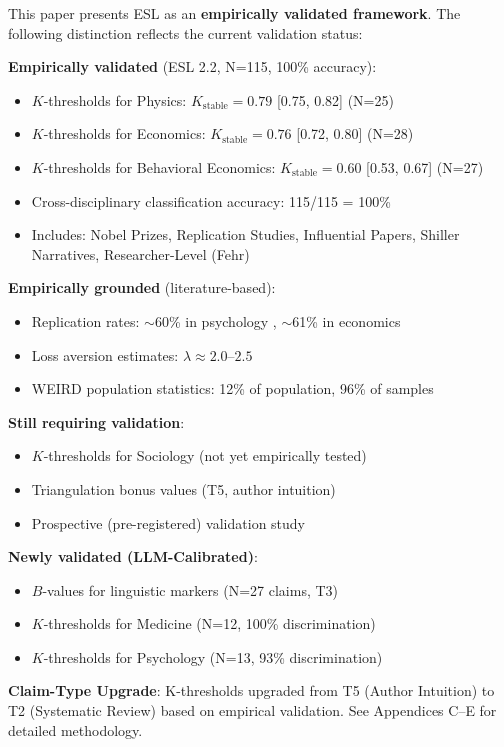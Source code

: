 \documentclass[11pt,a4paper]{article}
\begin{document}
\begin{warningbox}[title={Parameter Validation Status (ESL 2.2 Update)}]
This paper presents ESL as an \textbf{empirically validated framework}. The following distinction reflects the current validation status:

\textbf{Empirically validated} (ESL 2.2, N=115, 100\% accuracy):
\begin{itemize}
    \item $K$-thresholds for Physics: $K_{\text{stable}} = 0.79$ [0.75, 0.82] (N=25)
    \item $K$-thresholds for Economics: $K_{\text{stable}} = 0.76$ [0.72, 0.80] (N=28)
    \item $K$-thresholds for Behavioral Economics: $K_{\text{stable}} = 0.60$ [0.53, 0.67] (N=27)
    \item Cross-disciplinary classification accuracy: 115/115 = 100\%
    \item Includes: Nobel Prizes, Replication Studies, Influential Papers, Shiller Narratives, Researcher-Level (Fehr)
\end{itemize}

\textbf{Empirically grounded} (literature-based):
\begin{itemize}
    \item Replication rates: $\sim$60\% in psychology \citep{OpenScienceCollaboration2015}, $\sim$61\% in economics \citep{Camerer2016}
    \item Loss aversion estimates: $\lambda \approx 2.0$--$2.5$ \citep{KahnemanTversky1992, PopeSchweitzer2011}
    \item WEIRD population statistics: 12\% of population, 96\% of samples \citep{Henrich2010}
\end{itemize}

\textbf{Still requiring validation}:
\begin{itemize}
    \item $K$-thresholds for Sociology (not yet empirically tested)
    \item Triangulation bonus values (T5, author intuition)
    \item Prospective (pre-registered) validation study
\end{itemize}

\textbf{Newly validated (LLM-Calibrated)}:
\begin{itemize}
    \item $B$-values for linguistic markers (N=27 claims, T3)
    \item $K$-thresholds for Medicine (N=12, 100\% discrimination)
    \item $K$-thresholds for Psychology (N=13, 93\% discrimination)
\end{itemize}

\textbf{Claim-Type Upgrade}: K-thresholds upgraded from T5 (Author Intuition) to T2 (Systematic Review) based on empirical validation. See Appendices C--E for detailed methodology.
\end{warningbox}
\end{document}
